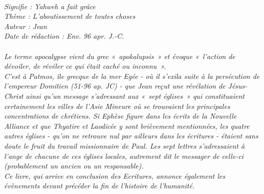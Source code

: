 \BFont
\noindent\hrulefill
\textit{
\bigskip
{\centering{}
\\Signifie : Yahweh a fait grâce
\\Thème : L'aboutissement de toutes choses
\\Auteur : Jean
\\Date de rédaction : Env. 96 apr. J.-C.\\}
}
\textit{
\\Le terme apocalypse vient du grec « apokalupsis » et évoque « l’action de dévoiler, de révéler ce qui était caché ou inconnu ».
\bigskip
\\C’est à Patmos, île grecque de la mer Egée - où il s’exila suite à la persécution de l’empereur Domitien (51-96 ap. JC) - que Jean reçut une révélation de Jésus-Christ ainsi qu’un message s’adressant aux « sept églises » qui constituaient certainement  les villes de l’Asie Mineure où se trouvaient les principales concentrations de chrétiens. Si Ephèse figure dans les écrits de la Nouvelle Alliance et que Thyatire et  Laodicée y sont brièvement mentionnées, les quatre autres églises - qu’on ne retrouve nul par ailleurs dans les écritures - étaient sans doute le fruit du travail missionnaire de Paul. Les sept lettres s’adressaient à l’ange de chacune de ces églises locales, autrement dit le messager de celle-ci (probablement un ancien ou un responsable).
\bigskip
\\Ce livre, qui arrive en conclusion des Ecritures, annonce également les évènements devant précéder la fin de l’histoire de l’humanité.\bigskip
}
\par\nobreak\noindent\hrulefill
